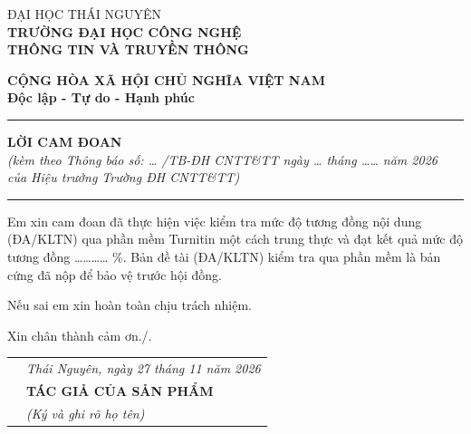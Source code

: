 \vspace*{5pt}


\noindent
\begin{minipage}[t]{0.45\textwidth}
    \centering
            ĐẠI HỌC THÁI NGUYÊN \\
    \textbf{TRƯỜNG ĐẠI HỌC CÔNG NGHỆ} \\
    \textbf{THÔNG TIN VÀ TRUYỀN THÔNG}
\end{minipage}%
\begin{minipage}[t]{0.59\textwidth}
    \centering
    \textbf{CỘNG HÒA XÃ HỘI CHỦ NGHĨA VIỆT NAM} \\
    \textbf{Độc lập - Tự do - Hạnh phúc} \\
    \setlength{\baselineskip}{10truept}
    \rule{0.4\linewidth}{0.4pt}
\end{minipage}

\vspace{1cm}

\begin{center}
    \textbf{\large LỜI CAM ĐOAN}\\[0.3cm]
    \textit{(kèm theo Thông báo số: \ldots{} /TB-ĐH CNTT\&TT ngày \ldots{} tháng \ldots\ldots{} năm 2026}\\
    \textit{của Hiệu trưởng Trường ĐH CNTT\&TT)}\\[0.1cm]
    \setlength{\baselineskip}{10truept}
    \rule{0.4\textwidth}{0.4pt}
\end{center}

\vspace{0.5cm}

{
\setlength{\baselineskip}{28truept}
\hspace{1cm} Em xin cam đoan đã thực hiện việc kiểm tra mức độ tương đồng nội dung (ĐA/KLTN) qua phần mềm Turnitin một cách trung thực và đạt kết quả mức độ tương đồng \ldots\ldots\ldots\ldots{} \%. Bản đề tài (ĐA/KLTN) kiểm tra qua phần mềm là bản cứng đã nộp để bảo vệ trước hội đồng.

\hspace{1cm} Nếu sai em xin hoàn toàn chịu trách nhiệm.

\hspace{1cm} Xin chân thành cảm ơn./.
}

\vspace{1cm}

\begin{tabular}{p{} >{\centering\arraybackslash}p{}}
 & \textit{Thái Nguyên, ngày 27 tháng 11 năm 2026} \\[0.5cm]
 & \textbf{TÁC GIẢ CỦA SẢN PHẨM} \\
 & \textit{(Ký và ghi rõ họ tên)} \\[2.5cm]
\end{tabular}
